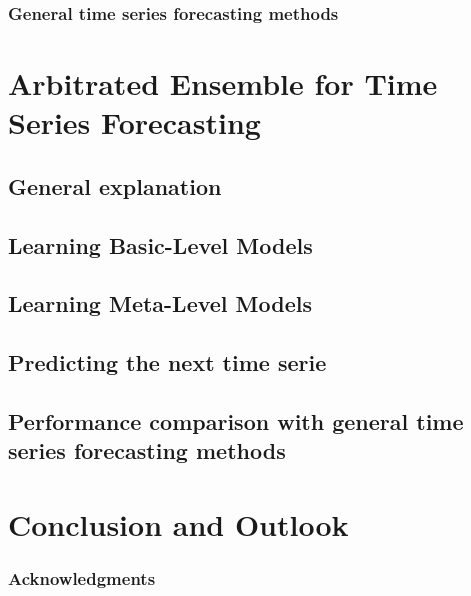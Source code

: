 \documentclass[runningheads,a4paper]{llncs}[2015/06/24]
\begin{document}
		\subsubsection{General time series forecasting methods}
\section{Arbitrated Ensemble for Time Series Forecasting}
\subsection{General explanation}
\subsection{Learning Basic-Level Models}
\subsection{Learning Meta-Level Models}
\subsection{Predicting the next time serie}
\subsection{Performance comparison with general time series forecasting methods}

\section{Conclusion and Outlook}

\subsubsection{Acknowledgments}




\end{document}
